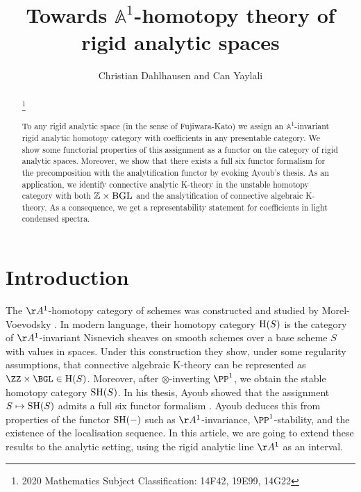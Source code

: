 \documentclass[colorinlistoftodos,article,11pt,reqno]{article}
\date{}
\title{Towards $\mathbb{A}^1$-homotopy theory of rigid analytic spaces}
\author{Christian Dahlhausen and Can Yaylali}
\newcommand{\Arig}{\AA^{1}}
\begin{document}
\maketitle
\begin{abstract}
\let\thefootnote\relax\footnote{2020 Mathematics Subject Classification: 14F42, 19E99, 14G22}

To any rigid analytic space (in the sense of Fujiwara-Kato) we assign an $\mathbb{A}^1$-invariant rigid analytic homotopy category with coefficients in any presentable category. We show some functorial properties of this assignment as a functor on the category of rigid analytic spaces. Moreover, we show that there exists a full six functor formalism for the precomposition with the analytification functor by evoking Ayoub's thesis. As an application, we identify connective analytic K-theory in the unstable homotopy category with both $\mathbb{Z}\times\textup{BGL}$ and the analytification of connective algebraic K-theory. As a consequence, we get a representability statement for coefficients in light condensed spectra.
\end{abstract}



\thispagestyle{empty}
\setcounter{tocdepth}{1}
\tableofcontents
\setcounter{tocdepth}{2}


\section{Introduction}
The $\AA^1$-homotopy category of schemes was constructed and studied by Morel\hyp{}Voevodsky \cite{MV1}.
In modern language, their homotopy category $\textup{H}(S)$ is the category of $\AA^1$\hyp{}invariant Nisnevich sheaves on smooth schemes over a base scheme $S$ with values in spaces. Under this construction they show, under some regularity assumptions, that connective algebraic K-theory can be represented as $\ZZ\times \BGL\in \textup{H}(S)$.
Moreover, after $\otimes$-inverting $\PP^1$, we obtain the stable homotopy category $\textup{SH}(S)$. In his thesis, Ayoub showed that the assignment $S\mapsto \textup{SH}(S)$ admits a full six functor formalism \cite{AyoubThesis}. 
Ayoub deduces this from properties of the functor $\textup{SH}(-)$ such as $\AA^1$-invariance, $\PP^1$-stability, and the existence of the localisation sequence. In this article, we are going to extend these results to the analytic setting, using the rigid analytic line $\Arig$ as an interval.
\end{document}
